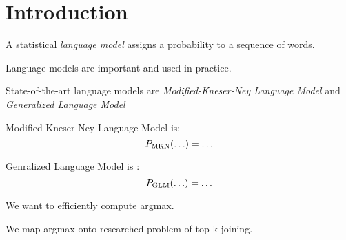 \documentclass[11pt,a4paper]{report}
\title{\mytitle}
\author{
  \myname \\
  \small{\myaddress} \\
  \small{\texttt{\href{mailto:\mymail}{\nolinkurl{\mymail}}}}
}
\date{\today}
\begin{document}
\maketitle

\vspace*{\fill}
\begin{minipage}{\linewidth} %
  \begin{abstract}
    Abstract.
  \end{abstract}

  \vspace{5em}

  \begin{abstract}
    Diesmal auf deutsch.
  \end{abstract}
\end{minipage}
\vspace*{\fill}

\tableofcontents

\chapter{Introduction}

A statistical \emph{language model} assigns a probability to a sequence of
words.

Language models are important and used in practice.

State-of-the-art language models are \emph{Modified-Kneser-Ney Language Model}
and \emph{Generalized Language Model}

Modified-Kneser-Ney Language Model is:
\begin{equation}
  \prob[\text{MKN}]{\ldots} = \ldots
\end{equation}

Genralized Language Model is \parencite{Pickhardt2014}:
\begin{equation}
  \prob[\text{GLM}]{\ldots} = \ldots
\end{equation}

We want to efficiently compute argmax.

We map argmax onto researched problem of top-k joining.
\end{document}
